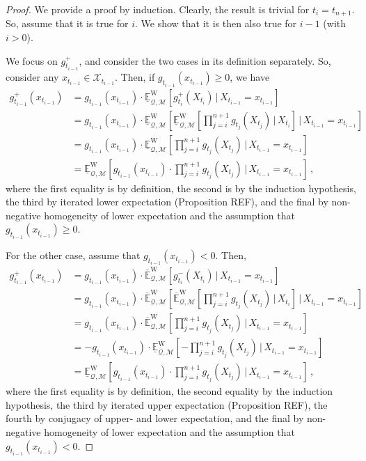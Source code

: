 \documentclass[twoside,11pt]{article}
\newcommand{\states}{\mathcal{X}}
\newcommand{\lexp}{\underline{\mathbb{E}}_{\rateset,\mathcal{M}}^\mathrm{W}}
\newcommand{\uexp}{\overline{\mathbb{E}}_{\rateset,\mathcal{M}}^\mathrm{W}}
\newcommand{\rateset}{\mathcal{Q}}
\begin{document}
\begin{proof}
We provide a proof by induction. Clearly, the result is trivial for $t_i=t_{n+1}$. So, assume that it is true for $i$. We show that it is then also true for $i-1$ (with $i>0$).

We focus on $g_{t_{i-1}}^+$, and consider the two cases in its definition separately. So, consider any $x_{t_{i-1}}\in\states_{t_{i-1}}$. Then, if $g_{t_{i-1}}(x_{t_{i-1}})\geq 0$, we have
\begin{align*}
g_{t_{i-1}}^+(x_{t_{i-1}}) &= g_{t_{i-1}}(x_{t_{i-1}})\cdot \lexp\left[g_{t_{i}}^+(X_{t_{i}})\,\vert\,X_{t_{i-1}}=x_{t_{i-1}}\right] \\
 &= g_{t_{i-1}}(x_{t_{i-1}})\cdot \lexp\left[\lexp\left[\prod_{j=i}^{n+1}g_{t_j}(X_{t_j})\,\vert\,X_{t_i}\right]\,\vert\,X_{t_{i-1}}=x_{t_{i-1}}\right] \\
 &= g_{t_{i-1}}(x_{t_{i-1}})\cdot \lexp\left[\prod_{j=i}^{n+1}g_{t_j}(X_{t_j})\,\vert\,X_{t_{i-1}}=x_{t_{i-1}}\right] \\ 
 &= \lexp\left[g_{t_{i-1}}(x_{t_{i-1}})\cdot\prod_{j=i}^{n+1}g_{t_j}(X_{t_j})\,\vert\,X_{t_{i-1}}=x_{t_{i-1}}\right]\,,
\end{align*}
where the first equality is by definition, the second is by the induction hypothesis, the third by iterated lower expectation (Proposition REF), and the final by non-negative homogeneity of lower expectation and the assumption that $g_{t_{i-1}}(x_{t_{i-1}})\geq 0$.

For the other case, assume that $g_{t_{i-1}}(x_{t_{i-1}})< 0$. Then,
\begin{align*}
g_{t_{i-1}}^+(x_{t_{i-1}}) &= g_{t_{i-1}}(x_{t_{i-1}})\cdot \uexp\left[g_{t_{i}}^-(X_{t_{i}})\,\vert\,X_{t_{i-1}}=x_{t_{i-1}}\right] \\
&= g_{t_{i-1}}(x_{t_{i-1}})\cdot \uexp\left[\uexp\left[\prod_{j=i}^{n+1}g_{t_j}(X_{t_j})\,\vert\,X_{t_i}\right]\,\vert\,X_{t_{i-1}}=x_{t_{i-1}}\right] \\
&= g_{t_{i-1}}(x_{t_{i-1}})\cdot \uexp\left[\prod_{j=i}^{n+1}g_{t_j}(X_{t_j})\,\vert\,X_{t_{i-1}}=x_{t_{i-1}}\right] \\
&= -g_{t_{i-1}}(x_{t_{i-1}})\cdot \lexp\left[-\prod_{j=i}^{n+1}g_{t_j}(X_{t_j})\,\vert\,X_{t_{i-1}}=x_{t_{i-1}}\right] \\
&= \lexp\left[g_{t_{i-1}}(x_{t_{i-1}})\cdot\prod_{j=i}^{n+1}g_{t_j}(X_{t_j})\,\vert\,X_{t_{i-1}}=x_{t_{i-1}}\right]\,,
\end{align*}
where the first equality is by definition, the second equality by the induction hypothesis, the third by iterated upper expectation (Proposition REF), the fourth by conjugacy of upper- and lower expectation, and the final by non-negative homogeneity of lower expectation and the assumption that $g_{t_{i-1}}(x_{t_{i-1}})<0$.


\end{proof}
\end{document}
